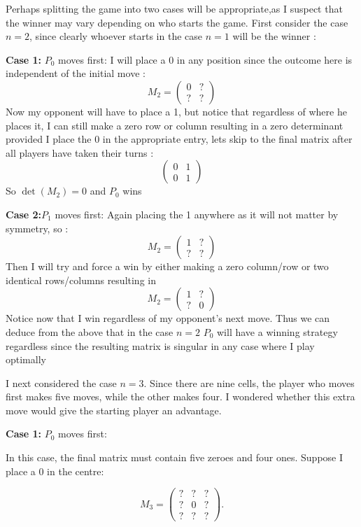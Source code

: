 \documentclass[11pt]{article}
\newcommand{\keywordfont}{\textsc}
\newcommand{\keyword}[1]{%
  \marginpar{\raggedright\small\keywordfont{#1}}}
\begin{document}
\keyword{ATTEMPT} Perhaps splitting the game into two cases will be appropriate,as I suspect that the winner may vary depending on who starts the game.
First consider the case $n=2$, since clearly whoever starts in the case $n=1$ will be the winner : 

\textbf{Case 1:} $P_0$ moves first: 
I will place a 0 in any position since the outcome  here is independent  of the initial move :$$ M_2 = \begin{pmatrix}
0&?\\
?&?
\end{pmatrix}$$ Now my opponent will have to place a 1, but notice that regardless of where he places it, I can still make a zero row or column resulting in a zero determinant provided I place the 0 in the appropriate entry, lets skip to the final matrix after all players have taken their turns : 
$$\begin{pmatrix}
0&1\\
0&1
\end{pmatrix}$$ So $\det(M_2)=0$ and $P_0$ wins

\textbf{Case 2:}$P_1$ moves first:
Again placing the 1 anywhere as it will not matter by symmetry, so : 
$$ M_2 = \begin{pmatrix}
1&?\\
?&?
\end{pmatrix}$$ Then I will try and force a win by either making a zero column/row or two identical rows/columns resulting in
$$ M_2 = \begin{pmatrix}
1&?\\
?&0
\end{pmatrix}$$
Notice now that I win regardless of my opponent's next move.
\keyword{NOTICE} Thus we can deduce from the above that in the case $n =2$ $P_0$ will have a winning strategy regardless since the resulting matrix is singular in any case where I play optimally


\medskip
\keyword{ATTEMPT}

I next considered the case $n=3$.
Since there are nine cells, the player
who moves first makes five moves,
while the other makes four.
I wondered whether this extra move
would give the starting player an
advantage.

\textbf{Case 1:} $P_0$ moves first:

In this case, the final matrix must
contain five zeroes and four ones.
Suppose I place a $0$ in the centre:

$$
M_3=\begin{pmatrix}
?&?&?\\
?&0&?\\
?&?&?
\end{pmatrix}.
$$
\end{document}
